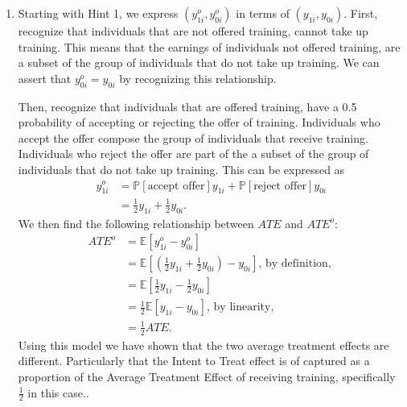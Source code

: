 \documentclass[
]{article}
\providecommand{\tightlist}{%
  \setlength{\itemsep}{0pt}\setlength{\parskip}{0pt}}
\begin{document}
\begin{enumerate}
\def\labelenumi{\arabic{enumi}.}
\setcounter{enumi}{3}
\tightlist
\item
  Starting with Hint 1, we express \((y_{1i}^o, y_{0i}^o)\) in terms of
  \((y_{1i}, y_{0i})\). First, recognize that individuals that are not
  offered training, cannot take up training. This means that the
  earnings of individuals not offered training, are a subset of the
  group of individuals that do not take up training. We can assert that
  \(y_{0i}^o = y_{0i}\) by recognizing this relationship.

  \par\medskip

  Then, recognize that individuals that are offered training, have a 0.5
  probability of accepting or rejecting the offer of training.
  Individuals who accept the offer compose the group of individuals that
  receive training. Individuals who reject the offer are part of the a
  subset of the group of individuals that do not take up training. This
  can be expressed as \begin{align*}
   y_{1i}^o &= \mathbb{P}[\text{accept offer}]y_{1i} + \mathbb{P}[\text{reject offer}]y_{0i}\\ 
   &= \frac{1}{2}y_{1i} + \frac{1}{2}y_{0i}.
  \end{align*} We then find the following relationship between \(ATE\)
  and \(ATE^o\): \begin{align*}
   ATE^o &= \mathbb{E}[y_{1i}^o - y_{0i}^o]\\
   &= \mathbb{E}[(\frac{1}{2}y_{1i} + \frac{1}{2}y_{0i}) - y_{0i}] \text{, by definition, }\\
   &= \mathbb{E}[\frac{1}{2}y_{1i} - \frac{1}{2}y_{0i}]\\
   &= \frac{1}{2}\mathbb{E}[y_{1i} - y_{0i}] \text{, by linearity, }\\
   &= \frac{1}{2}ATE.
  \end{align*} Using this model we have shown that the two average
  treatment effects are different. Particularly that the Intent to Treat
  effect is of captured as a proportion of the Average Treatment Effect
  of receiving training, specifically \(\frac{1}{2}\) in this case..
\end{enumerate}
\end{document}
